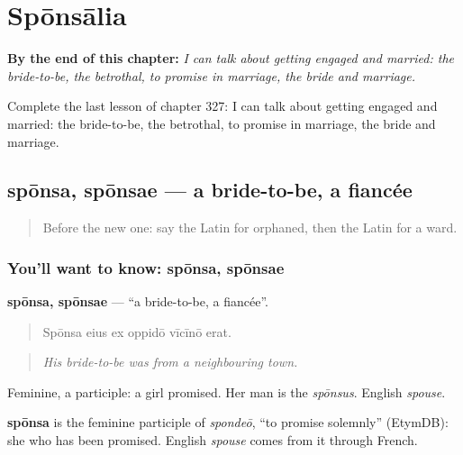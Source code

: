 
\chapter{Spōnsālia}
\label{ch:la-sponsalia}

\begin{chapteropening}
\textbf{By the end of this chapter:} \emph{I can talk about getting engaged and married: the bride-to-be, the betrothal, to promise in marriage, the bride and marriage.}

Complete the last lesson of chapter 327: I can talk about getting engaged and married: the bride-to-be, the betrothal, to promise in marriage, the bride and marriage.
\end{chapteropening}

\section[spōnsa, spōnsae]{spōnsa, spōnsae — a bride-to-be, a fiancée}

\label{lesson:LA-C327-sponsa}



\begin{quote}
Before the new one: say the Latin for orphaned, then the Latin for a ward.
\end{quote}

\subsection*{You'll want to know: spōnsa, spōnsae}
\textbf{spōnsa, spōnsae} — \textquotedblleft{}a bride-to-be, a fiancée\textquotedblright{}.

\begin{quote}
Spōnsa eius ex oppidō vīcīnō erat.
\end{quote}

\begin{quote}
\emph{His bride-to-be was from a neighbouring town.}
\end{quote}

Feminine, a participle: a girl promised. Her man is the \emph{spōnsus}. English \emph{spouse}.

\begin{cousinweb}
\textbf{spōnsa} is the feminine participle of \emph{spondeō}, \textquotedblleft{}to promise solemnly\textquotedblright{} (EtymDB): she who has been promised. English \emph{spouse} comes from it through French.
\end{cousinweb}


